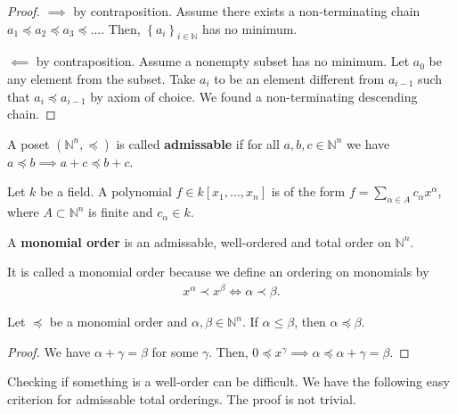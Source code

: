 \documentclass[a4paper, 11pt]{article}
\begin{document}
\begin{proof}
  \( \implies \) by contraposition. Assume there exists a non-terminating chain \( a_1 \preceq a_2 \preceq a_3 \preceq \dots \). Then, \( \left\{ a_i \right\}_{i \in \mathbb{N}} \) has no minimum.

  \( \impliedby \) by contraposition. Assume a nonempty subset has no minimum. Let \( a_0 \) be any element from the subset. Take \( a_i \) to be an element different from \( a_{i-1} \) such that \( a_i \preceq a_{i-1} \) by axiom of choice. We found a non-terminating descending chain.
\end{proof}

\begin{defi}
  A poset \( (\mathbb N^n, \preceq) \) is called \textbf{admissable} if for all \( a,b,c \in \mathbb N^n \) we have \( a \preceq b  \implies a + c \preceq b + c  \).
\end{defi}

\begin{defi}[Polynomial]
  Let \( k \) be a field. A polynomial \( f \in k[x_1,\dots,x_n] \) is of the form \( f = \sum_{\alpha \in A} c_{\alpha} x^\alpha \), where \( A \subset \mathbb N^n \) is finite and \( c_\alpha \in k \). 
\end{defi}

\begin{defi}
  A \textbf{monomial order} is an admissable, well-ordered and total order on \( \mathbb N^n \).
\end{defi}
It is called a monomial order because we define an ordering on monomials by 
\begin{align*}
  x^\alpha \prec x^\beta \iff \alpha \prec \beta.
\end{align*}

\begin{prop}
  Let \( \preceq \) be a monomial order and \( \alpha, \beta \in \mathbb N^n \). If \( \alpha \leq \beta \), then \( \alpha \preceq \beta \).
\end{prop}

\begin{proof}
  We have \( \alpha + \gamma = \beta \) for some \( \gamma \). Then, \( 0 \preceq x^\gamma \implies  \alpha \preceq \alpha + \gamma = \beta \).
\end{proof}


Checking if something is a well-order can be difficult. We have the following easy criterion for admissable total orderings. The proof is not trivial.
\end{document}
